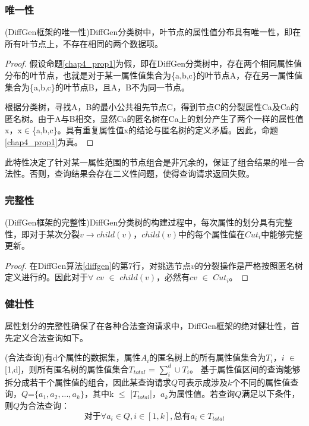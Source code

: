 \subsubsection{唯一性}
\begin{prop}
	\label{chap4_prop1}
	(DiffGen框架的唯一性)DiffGen分类树中，叶节点的属性值分布具有唯一性，即在所有叶节点上，不存在相同的两个数据项。
\end{prop}
\begin{proof}
	假设命题\ref{chap4_prop1}为假，即在DiffGen分类树中，存在两个相同属性值分布的叶节点，也就是对于某一属性值集合为\{a,b,c\}的叶节点A，存在另一属性值集合为\{a,b,c\}的叶节点B，且A，B不为同一节点。
	
	根据分类树，寻找A，B的最小公共祖先节点C，得到节点C的分裂属性Ca及Ca的匿名树。由于A与B相交，显然Ca的匿名树在Ca上的划分产生了两个一样的属性值x，x$\in$\{a,b,c\}。具有重复属性值x的结论与匿名树的定义矛盾。因此，命题\ref{chap4_prop1}为真。
\end{proof}
此特性决定了针对某一属性范围的节点组合是非冗余的，保证了组合结果的唯一合法性。否则，查询结果会存在二义性问题，使得查询请求返回失败。

\subsubsection{完整性}

\begin{prop}
	\label{chap4_prop2}
	(DiffGen框架的完整性)DiffGen分类树的构建过程中，每次属性的划分具有完整性，即对于某次分裂$v$$\rightarrow$$child(v)$，$child(v)$中的每个属性值在$Cut_{i}$中能够完整更新。
\end{prop}
\begin{proof}
	在DiffGen算法\ref{diffgen}的第7行，对挑选节点$v$的分裂操作是严格按照匿名树定义进行的。因此对于$\forall$ $cv$ $\in$ $child(v)$，必然有$cv$ $\in$ $Cut_{i}$。
\end{proof}

\subsubsection{健壮性}

属性划分的完整性确保了在各种合法查询请求中，DiffGen框架的绝对健壮性，首先定义合法查询如下。

\begin{defn}
	(合法查询)有d个属性的数据集，属性$A_{i}$的匿名树上的所有属性值集合为$T_{i}$，$i$ $\in$ [1,d]，则所有匿名树的属性值集合$T_{total}$ = $\sum\limits_i^d \cup T_{i}$。
	基于属性值区间的查询能够拆分成若干个属性值的组合，因此某查询请求$Q$可表示成涉及$k$个不同的属性值查询，$Q$=$\{a_{1},a_{2},...,a_{k}\}$，其中k $\leqslant$ |$T_{total}$|，$a_{k}$为属性值。若查询$Q$满足以下条件，则$Q$为合法查询：
	\begin{equation}
	\text{对于}\forall a_{i} \in Q, i \in [1,k], \text{总有}a_{i} \in T_{total}
	\end{equation}
\end{defn}

